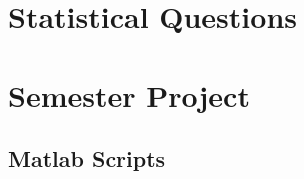 \documentclass[11pt,a4paper]{report}
\begin{document}
\tableofcontents

\chapter{Statistical Questions}


\chapter{Semester Project}





\begin{appendices}
\chapter{Matlab Scripts}

\end{appendices}
\end{document}
